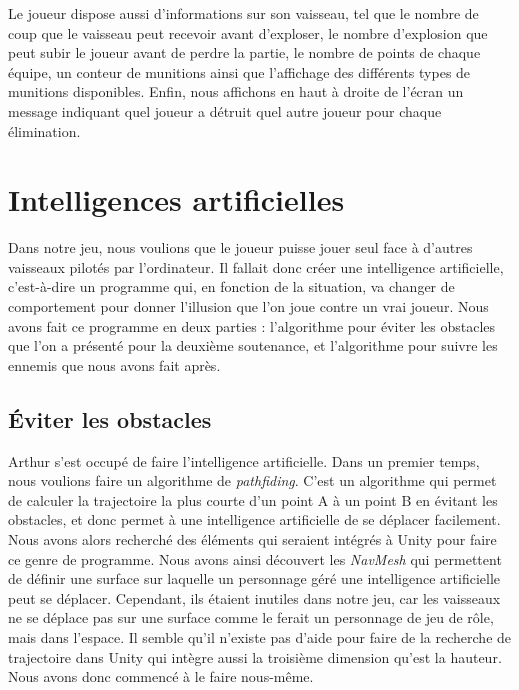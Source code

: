 \documentclass[12pt, titlepage]{article}
\begin{document}
\begin{spacing}{1.5}
 Le joueur dispose aussi d'informations sur son vaisseau, tel que le nombre de coup que le vaisseau peut recevoir avant d'exploser, le nombre d'explosion que peut subir le joueur avant de perdre la partie, le nombre de points de chaque équipe, un conteur de munitions ainsi que l'affichage des différents types de munitions disponibles. Enfin, nous affichons en haut à droite de l'écran un message indiquant quel joueur a détruit quel autre joueur pour chaque élimination.\\

\newpage
\section{Intelligences artificielles}

Dans notre jeu, nous voulions que le joueur puisse jouer seul face à d'autres vaisseaux pilotés par l'ordinateur. Il fallait donc créer une intelligence artificielle, c'est-à-dire un programme qui, en fonction de la situation, va changer de comportement pour donner l'illusion que l'on joue contre un vrai joueur. Nous avons fait ce programme en deux parties : l'algorithme pour éviter les obstacles que l'on a présenté pour la deuxième soutenance, et l'algorithme pour suivre les ennemis que nous avons fait après.\\

\subsection{Éviter les obstacles}

Arthur s'est occupé de faire l'intelligence artificielle. Dans un premier temps, nous voulions faire un  algorithme de \textit{pathfiding}. C'est un algorithme qui permet de calculer la trajectoire la plus courte d'un point A à un point B en évitant les obstacles, et donc permet à une intelligence artificielle de se déplacer facilement.\\

Nous avons alors recherché des éléments qui seraient intégrés à Unity pour faire ce genre de programme. Nous avons ainsi découvert les \textit{NavMesh} qui permettent de définir une surface sur laquelle un personnage géré une intelligence artificielle peut se déplacer. Cependant, ils étaient inutiles dans notre jeu, car les vaisseaux ne se déplace pas sur une surface comme le ferait un personnage de jeu de rôle, mais dans l'espace. Il semble qu'il n'existe pas d'aide pour faire de la recherche de trajectoire dans Unity qui intègre aussi la troisième dimension qu'est la hauteur. Nous avons donc commencé à le faire nous-même.\\


\end{spacing}
\end{document}
